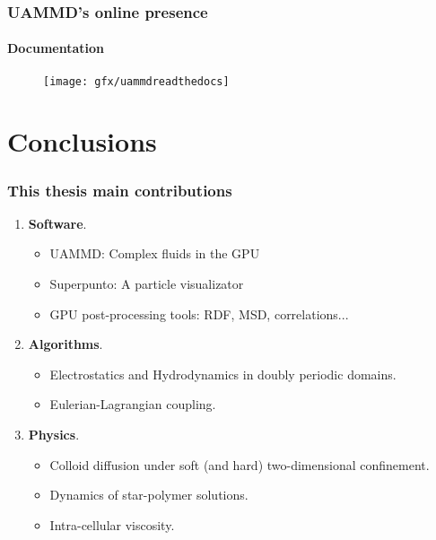\documentclass[xcolor=dvipsnames]{beamer}
\begin{document}
\begin{frame}
  \frametitle{UAMMD's online presence}
  \framesubtitle{Documentation}
  {}
  \begin{figure}
    \centering
    \texttt{[image: gfx/uammdreadthedocs]}
  \end{figure}
\end{frame}

\section{Conclusions}
\begin{frame}
  \frametitle{This thesis main contributions}
  \begin{enumerate}
    \Large\color{blue}
  \item \textbf{Software}.
    \begin{itemize}
    \item<+-> UAMMD: Complex fluids in the GPU      
    \item<+-> Superpunto: A particle visualizator
    \item<+-> GPU post-processing tools: RDF, MSD, correlations...
    \end{itemize}
  \item<+-> \textbf{Algorithms}.
    \begin{itemize}
    \item<+-> Electrostatics and Hydrodynamics in doubly periodic domains.
    \item<+-> Eulerian-Lagrangian coupling.
    \end{itemize}
  \item<+-> \textbf{Physics}.
    \begin{itemize}
    \item<+-> Colloid diffusion under soft (and hard) two-dimensional confinement.
    \item<+-> Dynamics of star-polymer solutions.
    \item<+-> Intra-cellular viscosity.
    \end{itemize}
  \end{enumerate}
\end{frame}
\end{document}

